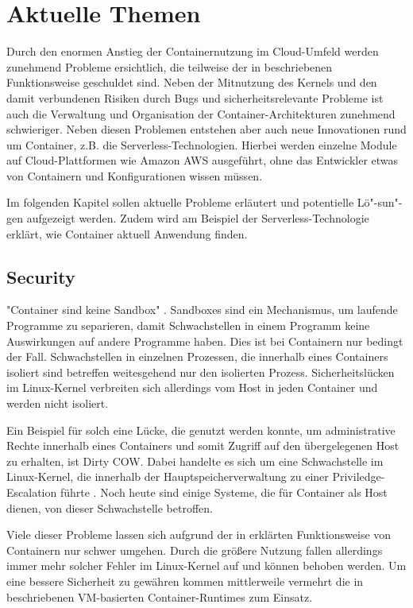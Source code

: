 \chapter{Aktuelle Themen}
\label{chap:aktuelles}

Durch den enormen Anstieg der Containernutzung im Cloud-Umfeld werden zunehmend Probleme ersichtlich, die teilweise der in  beschriebenen Funktionsweise geschuldet sind. Neben der Mitnutzung des Kernels und den damit verbundenen Risiken durch Bugs und sicherheitsrelevante Probleme ist auch die Verwaltung und Organisation der Container-Architekturen zunehmend schwieriger. Neben diesen Problemen entstehen aber auch neue Innovationen rund um Container, z.B. die Serverless-Technologien. Hierbei werden einzelne Module auf Cloud-Plattformen wie Amazon AWS ausgeführt, ohne das Entwickler etwas von Containern und Konfigurationen wissen müssen.

Im folgenden Kapitel sollen aktuelle Probleme erläutert und potentielle Lö"-sun"-gen aufgezeigt werden. Zudem wird am Beispiel der Serverless-Technologie erklärt, wie Container aktuell Anwendung finden.

\section{Security}
\label{sec:aktuellesSecurity}

"Container sind keine Sandbox" \citep{OpenSourcingGVisoraSandboxedContainerRuntime}. Sandboxes sind ein Mechanismus, um laufende Programme zu separieren, damit Schwachstellen in einem Programm keine Auswirkungen auf andere Programme haben. Dies ist bei Containern nur bedingt der Fall. Schwachstellen in einzelnen Prozessen, die innerhalb eines Containers isoliert sind betreffen weitesgehend nur den isolierten Prozess. Sicherheitslücken im Linux-Kernel verbreiten sich allerdings vom Host in jeden Container und werden nicht isoliert.

Ein Beispiel für solch eine Lücke, die genutzt werden konnte, um administrative Rechte innerhalb eines Containers und somit Zugriff auf den übergelegenen Host zu erhalten, ist Dirty COW. Dabei handelte es sich um eine Schwachstelle im Linux-Kernel, die innerhalb der Hauptspeicherverwaltung zu einer Priviledge-Escalation führte \citep{DirtyCOWCVE20165195}. Noch heute sind einige Systeme, die für Container als Host dienen, von dieser Schwachstelle betroffen.

Viele dieser Probleme lassen sich aufgrund der in  erklärten Funktionsweise von Containern nur schwer umgehen. Durch die größere Nutzung fallen allerdings immer mehr solcher Fehler im Linux-Kernel auf und können behoben werden. Um eine bessere Sicherheit zu gewähren kommen mittlerweile vermehrt die in  beschriebenen VM-basierten Container-Runtimes zum Einsatz.

